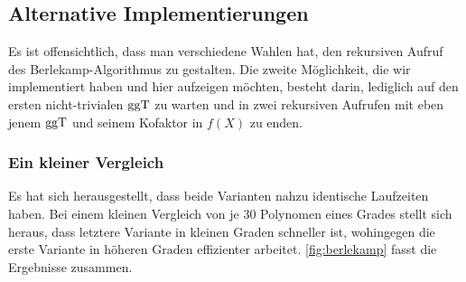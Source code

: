 \subsection{Alternative Implementierungen}

Es ist offensichtlich, dass man verschiedene Wahlen hat, den rekursiven Aufruf
des Berlekamp-Algorithmus zu gestalten. Die zweite Möglichkeit, die wir
implementiert haben und hier aufzeigen möchten, besteht darin, lediglich auf
den ersten nicht-trivialen $\operatorname{ggT}$ zu warten und in zwei rekursiven Aufrufen mit
eben jenem $\operatorname{ggT}$ und seinem Kofaktor in $f(X)$ zu enden.


\subsubsection{Ein kleiner Vergleich}

Es hat sich herausgestellt, dass beide Varianten nahzu identische Laufzeiten
haben. Bei einem kleinen Vergleich von je 30 Polynomen eines Grades
stellt sich heraus, dass letztere Variante in kleinen Graden schneller ist,
wohingegen die erste Variante in höheren Graden effizienter arbeitet.
\autoref{fig:berlekamp} fasst die Ergebnisse zusammen.

